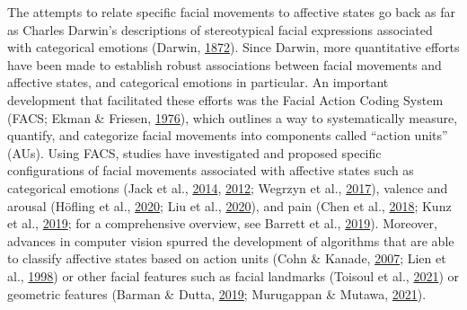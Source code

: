 \documentclass[11pt,american,]{memoir} %
\begin{document}
The attempts to relate specific facial movements to affective states go back as far as Charles Darwin's descriptions of stereotypical facial expressions associated with categorical emotions (Darwin, \protect\hyperlink{ref-Darwin1872-nv}{1872}). Since Darwin, more quantitative efforts have been made to establish robust associations between facial movements and affective states, and categorical emotions in particular. An important development that facilitated these efforts was the Facial Action Coding System (FACS; Ekman \& Friesen, \protect\hyperlink{ref-Ekman1976-hm}{1976}), which outlines a way to systematically measure, quantify, and categorize facial movements into components called ``action units'' (AUs). Using FACS, studies have investigated and proposed specific configurations of facial movements associated with affective states such as categorical emotions (Jack et al., \protect\hyperlink{ref-Jack2014-ku}{2014}, \protect\hyperlink{ref-Jack2012-eq}{2012}; Wegrzyn et al., \protect\hyperlink{ref-Wegrzyn2017-ke}{2017}), valence and arousal (Höfling et al., \protect\hyperlink{ref-Hofling2020-mk}{2020}; Liu et al., \protect\hyperlink{ref-Liu2020-vo}{2020}), and pain (Chen et al., \protect\hyperlink{ref-chen2018distinct}{2018}; Kunz et al., \protect\hyperlink{ref-Kunz2019-uh}{2019}; for a comprehensive overview, see Barrett et al., \protect\hyperlink{ref-Barrett2019-bc}{2019}). Moreover, advances in computer vision spurred the development of algorithms that are able to classify affective states based on action units (Cohn \& Kanade, \protect\hyperlink{ref-Cohn2007-xe}{2007}; Lien et al., \protect\hyperlink{ref-Lien1998-bg}{1998}) or other facial features such as facial landmarks (Toisoul et al., \protect\hyperlink{ref-Toisoul2021-yc}{2021}) or geometric features (Barman \& Dutta, \protect\hyperlink{ref-Barman2019-af}{2019}; Murugappan \& Mutawa, \protect\hyperlink{ref-Murugappan2021-yj}{2021}).
\end{document}
